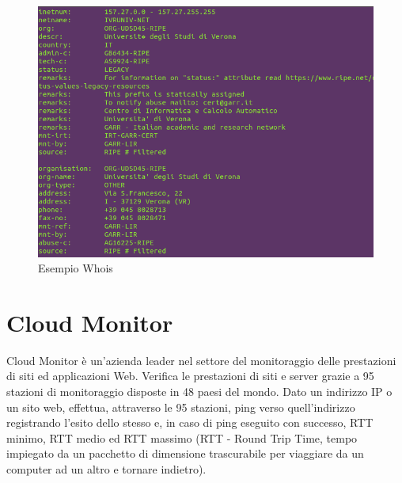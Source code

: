 \documentclass[a4paper,11pt]{book}
\begin{document}
~

\begin{figure}[!ht]
\centering
\includegraphics[scale = 0.7]{Whois.png}
\caption{Esempio Whois}
\end{figure}

\clearpage

\section{Cloud Monitor}
Cloud Monitor \cite{rif8} \`e un'azienda leader nel settore del monitoraggio delle prestazioni di siti ed applicazioni Web. Verifica le prestazioni di siti e server grazie a 95 stazioni di monitoraggio disposte in 48 paesi del mondo. 
Dato un indirizzo IP o un sito web, effettua, attraverso le 95 stazioni, ping verso quell'indirizzo registrando l'esito dello stesso e, in caso di ping eseguito con successo, RTT minimo, RTT medio ed RTT massimo (RTT - Round Trip Time, tempo impiegato da un pacchetto di dimensione trascurabile per viaggiare da un computer ad un altro e tornare indietro). 

~
\end{document}
